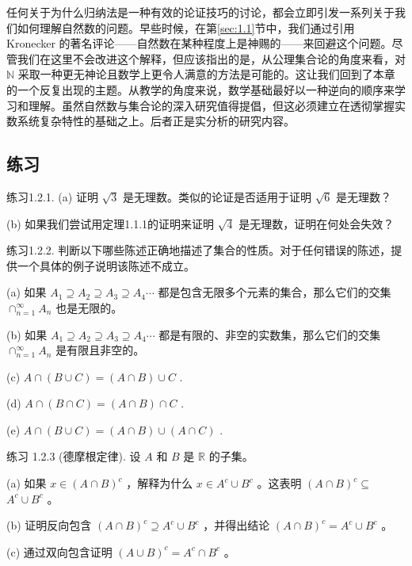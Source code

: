 任何关于为什么归纳法是一种有效的论证技巧的讨论，都会立即引发一系列关于我们如何理解自然数的问题。早些时候，在第\ref{sec:1.1}节中，我们通过引用 Kronecker 的著名评论——自然数在某种程度上是神赐的——来回避这个问题。尽管我们在这里不会改进这个解释，但应该指出的是，从公理集合论的角度来看，对 \(\mathbb{N}\) 采取一种更无神论且数学上更令人满意的方法是可能的。这让我们回到了本章的一个反复出现的主题。从教学的角度来说，数学基础最好以一种逆向的顺序来学习和理解。虽然自然数与集合论的深入研究值得提倡，但这必须建立在透彻掌握实数系统复杂特性的基础之上。后者正是实分析的研究内容。

\subsection{练习}

练习1.2.1. (a) 证明 \(\sqrt{3}\) 是无理数。类似的论证是否适用于证明 \(\sqrt{6}\) 是无理数？

(b) 如果我们尝试用定理1.1.1的证明来证明 \(\sqrt{4}\) 是无理数，证明在何处会失效？

练习1.2.2. 判断以下哪些陈述正确地描述了集合的性质。对于任何错误的陈述，提供一个具体的例子说明该陈述不成立。

(a) 如果 \({A}_{1} \supseteq  {A}_{2} \supseteq  {A}_{3} \supseteq  {A}_{4}\cdots\) 都是包含无限多个元素的集合，那么它们的交集 \({ \cap  }_{n = 1}^{\infty }{A}_{n}\) 也是无限的。

(b) 如果 \({A}_{1} \supseteq  {A}_{2} \supseteq  {A}_{3} \supseteq  {A}_{4}\cdots\) 都是有限的、非空的实数集，那么它们的交集 \({ \cap  }_{n = 1}^{\infty }{A}_{n}\) 是有限且非空的。

(c) \(A \cap  \left( {B \cup  C}\right)  = \left( {A \cap  B}\right)  \cup  C\) .

(d) \(A \cap  \left( {B \cap  C}\right)  = \left( {A \cap  B}\right)  \cap  C\) .

(e) \(A \cap  \left( {B \cup  C}\right)  = \left( {A \cap  B}\right)  \cup  \left( {A \cap  C}\right)\) .

练习 1.2.3 (德摩根定律). 设 \(A\) 和 \(B\) 是 \(\mathbb{R}\) 的子集。

(a) 如果 \(x \in  {\left( A \cap  B\right) }^{c}\) ，解释为什么 \(x \in  {A}^{c} \cup  {B}^{c}\) 。这表明 \({\left( A \cap  B\right) }^{c} \subseteq\)  \({A}^{c} \cup  {B}^{c}\) 。

(b) 证明反向包含 \({\left( A \cap  B\right) }^{c} \supseteq  {A}^{c} \cup  {B}^{c}\) ，并得出结论 \({\left( A \cap  B\right) }^{c} = {A}^{c} \cup  {B}^{c}\) 。

(c) 通过双向包含证明 \({\left( A \cup  B\right) }^{c} = {A}^{c} \cap  {B}^{c}\) 。

